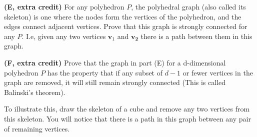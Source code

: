\documentclass[11pt]{article}
\begin{document}
\medskip

\noindent\textbf{(E, extra credit)} For any polyhedron $P$, the
polyhedral graph (also called its skeleton) is one where the nodes
form the vertices of the polyhedron, and the edges connect adjacent
vertices. Prove that this graph is strongly connected for any
$P$. I.e, given any two vertices $\mathbf{v}_1$ and $\mathbf{v_2}$
there is a path between them in this graph.

\medskip

\noindent\textbf{(F, extra credit)}  Prove that the graph in part (E)
for a d-dimensional polyhedron $P$ has the property that if any subset
of $d-1$ or fewer vertices in the graph are removed, it will still
remain strongly connected (This is called Balinski's theorem).

To illustrate this, draw the skeleton of a cube and remove any two
vertices from this skeleton. You will notice that there is a path in
this graph between any pair of remaining vertices.
\end{document}
